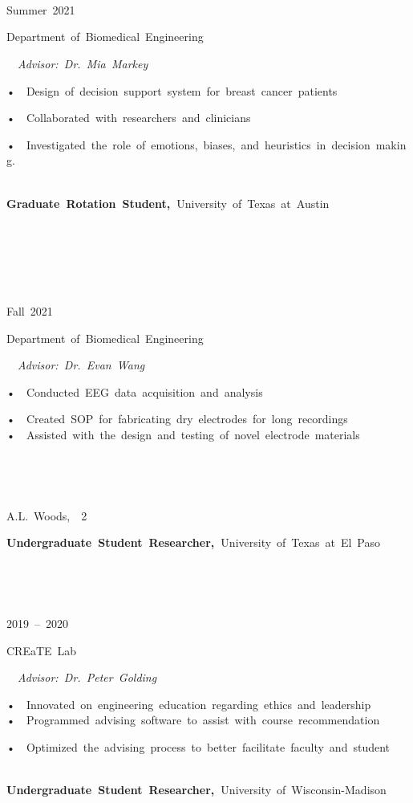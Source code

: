\documentclass[
]{article}
\begin{document}
\textbf{~}

\textbf{~}

\textbf{~}

Summer~2021~

Department~of~Biomedical~Engineering

~\textbar~\emph{Advisor:~Dr.~Mia~Markey}~

•~~Design~of~decision~support~system~for~breast~cancer~patients~

•~~Collaborated~with~researchers~and~clinicians~~

•~~Investigated~the~role~of~emotions,~biases,~and~heuristics~in~decision~making.~

\textbf{~\\
Graduate~Rotation~Student,~}University~of~Texas~at~Austin\textbf{~}

\textbf{~}

\textbf{~}

\textbf{~}

Fall~2021~

Department~of~Biomedical~Engineering

~\textbar~\emph{Advisor:~Dr.~Evan~Wang}~

•~~Conducted~EEG~data~acquisition~and~analysis~~

•~~Created~SOP~for~fabricating~dry~electrodes~for~long~recordings~\\
•~~Assisted~with~the~design~and~testing~of~novel~electrode~materials~

~

\protect{}\label{2}{}

\protect{}\label{page2-div}
~

A.L.~Woods,~~2~

\textbf{Undergraduate~Student~Researcher,~}University~of~Texas~at~El~Paso\textbf{~}

\textbf{~}

\textbf{~}

2019~--~2020~

CREaTE~Lab

~\textbar~\emph{Advisor:~Dr.~Peter~Golding}~

•~~Innovated~on~engineering~education~regarding~ethics~and~leadership~\\
•~~Programmed~advising~software~to~assist~with~course~recommendation~

•~~Optimized~the~advising~process~to~better~facilitate~faculty~and~student~~

~\\
\textbf{Undergraduate~Student~Researcher,~}University~of~Wisconsin-Madison\textbf{~~~}
\end{document}
